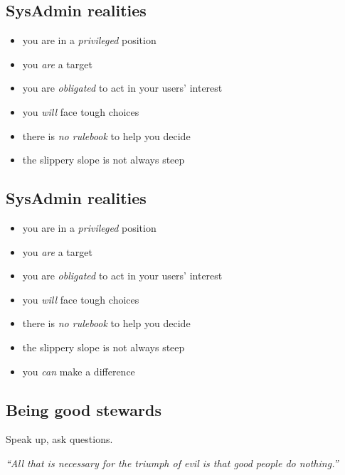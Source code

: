 \documentclass[xga]{xdvislides}
\begin{document}
\subsection{SysAdmin realities}
\begin{itemize}
	\item you are in a {\em privileged} position
	\item you {\em are} a target
	\item you are {\em obligated} to act in your users' interest
	\item you {\em will} face tough choices
	\item there is {\em no rulebook} to help you decide
	\item the slippery slope is not always steep
\end{itemize}

\subsection{SysAdmin realities}
\begin{itemize}
	\item you are in a {\em privileged} position
	\item you {\em are} a target
	\item you are {\em obligated} to act in your users' interest
	\item you {\em will} face tough choices
	\item there is {\em no rulebook} to help you decide
	\item the slippery slope is not always steep
	\item you {\em can} make a difference
\end{itemize}

\subsection{Being good stewards}
\Huge
\vspace*{\fill}
\begin{center}

Speak up, ask questions. \\

\vspace{.5in}

{\em ``All that is necessary for the triumph of evil is
that good people do nothing.''}

\end{center}
\vspace*{\fill}
\Normalsize
\end{document}
